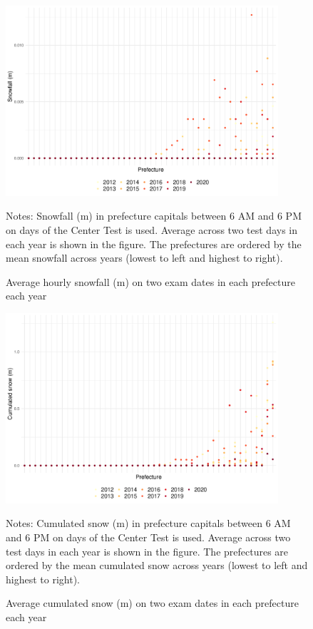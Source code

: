\documentclass[12pt,letterpaper]{article}
\begin{document}
\begin{figure}[H]
  \centering
  \caption{Average hourly snowfall (m) on two exam dates in each prefecture each year}
  \includegraphics[width = 0.9\textwidth]{../Output/images/snowfall_diff.pdf}
  \label{fig:snowfall_diff}
  \footnotesize
  \begin{tablenotes}
    \item Notes:
      Snowfall (m) in prefecture capitals between 6 AM and 6 PM on days of the Center Test is used.
      Average across two test days in each year is shown in the figure.
      The prefectures are ordered by the mean snowfall across years (lowest to left and highest to right).
  \end{tablenotes}
\end{figure}

\begin{figure}[H]
  \centering
  \caption{Average cumulated snow (m) on two exam dates in each prefecture each year}
  \includegraphics[width = 0.9\textwidth]{../Output/images/cum_snow_diff.pdf}
  \label{fig:cum_snow_diff}
  \footnotesize
  \begin{tablenotes}
    \item Notes:
      Cumulated snow (m) in prefecture capitals between 6 AM and 6 PM on days of the Center Test is used.
      Average across two test days in each year is shown in the figure.
      The prefectures are ordered by the mean cumulated snow across years (lowest to left and highest to right).
  \end{tablenotes}
\end{figure}
\end{document}
